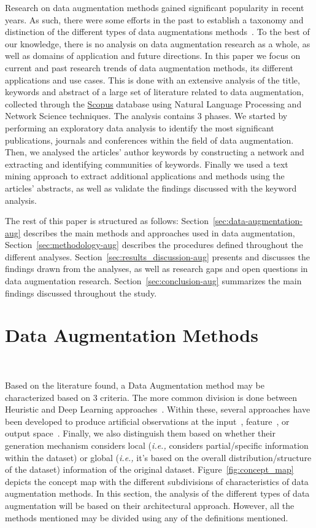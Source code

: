 Research on data augmentation methods gained significant popularity in recent
years. As such, there were some efforts in the past to establish a taxonomy
and distinction of the different types of data augmentations
methods~\cite{Shorten2019}. To the best of our knowledge, there is no analysis
on data augmentation research as a whole, as well as domains of application
and future directions. In this paper we focus on current and past research
trends of data augmentation methods, its different applications and use cases.
This is done with an extensive analysis of the title, keywords and abstract of
a large set of literature related to data augmentation, collected through the
\href{https://www.scopus.com/}{Scopus} database using Natural Language
Processing and Network Science techniques. The analysis contains 3 phases. We
started by performing an exploratory data analysis to identify the most
significant publications, journals and conferences within the field of data
augmentation. Then, we analysed the articles' author keywords by constructing
a network and extracting and identifying communities of keywords.  Finally we
used a text mining approach to extract additional applications and methods
using the articles' abstracts, as well as validate the findings discussed with
the keyword analysis.

The rest of this paper is structured as follows:
Section~\ref{sec:data-augmentation-aug} describes the main methods and approaches
used in data augmentation, Section~\ref{sec:methodology-aug} describes the
procedures defined throughout the different analyses.
Section~\ref{sec:results_discussion-aug} presents and discusses the findings drawn
from the analyses, as well as research gaps and open questions in data
augmentation research. Section~\ref{sec:conclusion-aug} summarizes the main
findings discussed throughout the study.

\section{Data Augmentation Methods}~\label{sec:data-augmentation-aug}
 
Based on the literature found, a Data Augmentation method may be characterized
based on 3 criteria. The more common division is done between Heuristic and
Deep Learning approaches~\cite{Shorten2019}. Within these, several approaches
have been developed to produce artificial observations at the
input~\cite{Zhong2020}, feature~\cite{DeVries2017}, or output
space~\cite{Behpour2019}. Finally, we also distinguish them based on whether
their generation mechanism considers local (\textit{i.e.,} considers
partial/specific information within the dataset) or global (\textit{i.e.,}
it's based on the overall distribution/structure of the dataset) information
of the original dataset. Figure~\ref{fig:concept_map} depicts the concept map
with the different subdivisions of characteristics of data augmentation
methods. In this section, the analysis of the different types of data
augmentation will be based on their architectural approach. However, all the
methods mentioned may be divided using any of the definitions mentioned.

